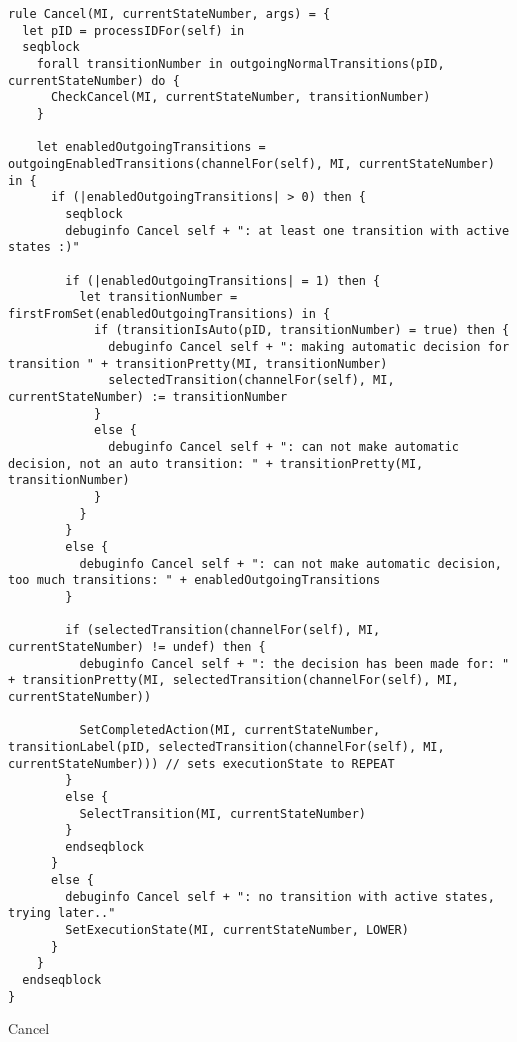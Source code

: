 \begin{listing}[H]
\begin{verbatim}
rule Cancel(MI, currentStateNumber, args) = {
  let pID = processIDFor(self) in
  seqblock
    forall transitionNumber in outgoingNormalTransitions(pID, currentStateNumber) do {
      CheckCancel(MI, currentStateNumber, transitionNumber)
    }

    let enabledOutgoingTransitions = outgoingEnabledTransitions(channelFor(self), MI, currentStateNumber) in {
      if (|enabledOutgoingTransitions| > 0) then {
        seqblock
        debuginfo Cancel self + ": at least one transition with active states :)"

        if (|enabledOutgoingTransitions| = 1) then {
          let transitionNumber = firstFromSet(enabledOutgoingTransitions) in {
            if (transitionIsAuto(pID, transitionNumber) = true) then {
              debuginfo Cancel self + ": making automatic decision for transition " + transitionPretty(MI, transitionNumber)
              selectedTransition(channelFor(self), MI, currentStateNumber) := transitionNumber
            }
            else {
              debuginfo Cancel self + ": can not make automatic decision, not an auto transition: " + transitionPretty(MI, transitionNumber)
            }
          }
        }
        else {
          debuginfo Cancel self + ": can not make automatic decision, too much transitions: " + enabledOutgoingTransitions
        }

        if (selectedTransition(channelFor(self), MI, currentStateNumber) != undef) then {
          debuginfo Cancel self + ": the decision has been made for: " + transitionPretty(MI, selectedTransition(channelFor(self), MI, currentStateNumber))

          SetCompletedAction(MI, currentStateNumber, transitionLabel(pID, selectedTransition(channelFor(self), MI, currentStateNumber))) // sets executionState to REPEAT
        }
        else {
          SelectTransition(MI, currentStateNumber)
        }
        endseqblock
      }
      else {
        debuginfo Cancel self + ": no transition with active states, trying later.."
        SetExecutionState(MI, currentStateNumber, LOWER)
      }
    }
  endseqblock
}
\end{verbatim}
\caption{Cancel}
\label{lst:asm:Cancel}
\end{listing}




